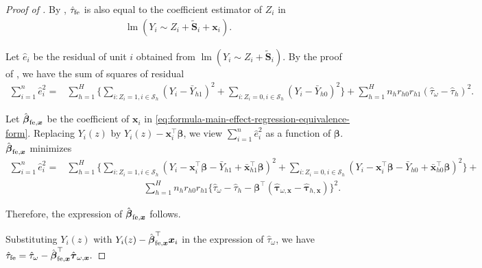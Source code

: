 \documentclass[12pt]{article}
\newcommand{\lmm}{\operatorname{lm}}
\newcommand{\ms}{\mathcal{S}}
\newcommand{\fe}{\textnormal{fe}}
\newcommand{\bs}{\boldsymbol}
\begin{document}
\begin{proof}[Proof of ]
   By , $\hat{\tau}_{\fe }$ is also equal to the coefficient estimator of $Z_i$ in 
   \begin{align}
   \label{eq:formula-main-effect-regression-equivalence-form}
    \lmm(Y_i \sim Z_i+ \tilde{\bs{S}}_i + \bs{x}_i).
\end{align}

Let $\hat{e}_i$ be the residual of unit $i$ obtained from $\lmm(Y_i \sim Z_i+ \tilde{\bs{S}}_i)$.  By the proof of \cite[][Theorem 6]{ding2021frisch}, we have the sum of squares of residual
\begin{align*}
    \sum_{i=1}^n \hat{e}_i^2 =& \sum_{h=1}^H  \Big\{\sum_{i:Z_i=1,i\in \ms_{ h }}(Y_i - \bar{Y}_{h1})^2 + \sum_{i:Z_i=0,i\in \ms_{ h }}(Y_i - \bar{Y}_{h0} )^2 \Big\} + \sum_{h=1}^H n_{h} r_{h0} r_{h1} (\hat{\tau}_{\omega}-\hat{\tau}_{h})^2.
\end{align*}

Let $\hat{\bs{\beta}}_{\fe, \bs{x}}$ be the coefficient of $\bs{x}_i$ in \eqref{eq:formula-main-effect-regression-equivalence-form}. Replacing $Y_i(z)$ by $Y_i(z)-\bs{x}_i^\top\bs{\beta}$, we view $\sum_{i=1}^n \hat{e}_i^2$ as a function of $\bs{\beta}$. $\hat{\bs{\beta}}_{\fe, \bs{x}}$ minimizes 
\begin{align*}
    \sum_{i=1}^n \hat{e}_i^2 =& \sum_{h=1}^H  \Big\{\sum_{i:Z_i=1,i\in \ms_{ h }}(Y_i-\bs{x}_i^\top \bs{\beta} - \bar{Y}_{h1} + \bar{\bs{x}}_{h1}^\top \bs{\beta})^2  +   \sum_{i:Z_i=0,i\in \ms_{ h }}(Y_i-\bs{x}_i^\top \bs{\beta} - \bar{Y}_{h0} + \bar{\bs{x}}_{h0}^\top \bs{\beta})^2\Big\} + \\
    &\qquad \qquad \qquad \qquad \sum_{h=1}^H n_{h} r_{h0} r_{h1} \big\{\hat{\tau}_{\omega}-\hat{\tau}_{h}-\bs{\beta}^\top(\hat{\bs{\tau}}_{\omega,\bs{x}}-\hat{\bs{\tau}}_{h,\bs{x}})\big\}^2.
\end{align*}

Therefore, the expression of $\hat{\bs{\beta}}_{\fe, \bs{x}}$ follows.

Substituting $Y_i(z)$ with $Y_i(z) - \hat{\bs{\beta}}_{\fe, \bs{x}}^\top \bs{x}_i$ in the expression of $\hat{\tau}_{\omega}$, we have $  \hat{\tau}_{\fe } = \hat{\tau}_{\omega} -\hat{\bs{\beta}}_{\fe, \bs{x}}^\top \hat{\bs{\tau}}_{\omega,\bs{x}}.$
\end{proof}
\end{document}
